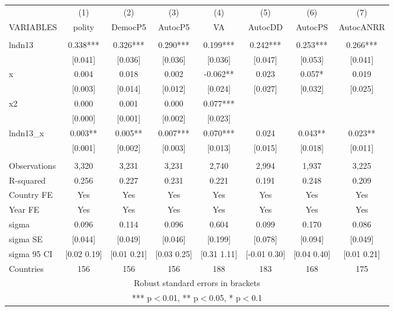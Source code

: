 \begin{tabular}{lccccccc} \hline
 & (1) & (2) & (3) & (4) & (5) & (6) & (7) \\
VARIABLES & polity & DemocP5 & AutocP5 & VA & AutocDD & AutocPS & AutocANRR \\ \hline
 &  &  &  &  &  &  &  \\
lndn13 & 0.338*** & 0.326*** & 0.290*** & 0.199*** & 0.242*** & 0.253*** & 0.266*** \\
 & [0.041] & [0.036] & [0.036] & [0.036] & [0.047] & [0.053] & [0.041] \\
x & 0.004 & 0.018 & 0.002 & -0.062** & 0.023 & 0.057* & 0.019 \\
 & [0.003] & [0.014] & [0.012] & [0.024] & [0.027] & [0.032] & [0.025] \\
x2 & 0.000 & 0.001 & 0.000 & 0.077*** &  &  &  \\
 & [0.000] & [0.001] & [0.002] & [0.023] &  &  &  \\
lndn13\_x & 0.003** & 0.005** & 0.007*** & 0.070*** & 0.024 & 0.043** & 0.023** \\
 & [0.001] & [0.002] & [0.003] & [0.013] & [0.015] & [0.018] & [0.011] \\
 &  &  &  &  &  &  &  \\
Observations & 3,320 & 3,231 & 3,231 & 2,740 & 2,994 & 1,937 & 3,225 \\
R-squared & 0.256 & 0.227 & 0.231 & 0.221 & 0.191 & 0.248 & 0.209 \\
Country FE & Yes & Yes & Yes & Yes & Yes & Yes & Yes \\
Year FE & Yes & Yes & Yes & Yes & Yes & Yes & Yes \\
sigma & 0.096 & 0.114 & 0.096 & 0.604 & 0.099 & 0.170 & 0.086 \\
sigma SE & [0.044] & [0.049] & [0.046] & [0.199] & [0.078] & [0.094] & [0.049] \\
sigma 95 CI & [0.02 0.19] & [0.01 0.21] & [0.03 0.25] & [0.31 1.11] & [-0.01 0.30] & [0.04 0.40] & [0.01 0.21] \\
 Countries & 156 & 156 & 156 & 188 & 183 & 168 & 175 \\ \hline
\multicolumn{8}{c}{ Robust standard errors in brackets} \\
\multicolumn{8}{c}{ *** p$<$0.01, ** p$<$0.05, * p$<$0.1} \\
\end{tabular}

